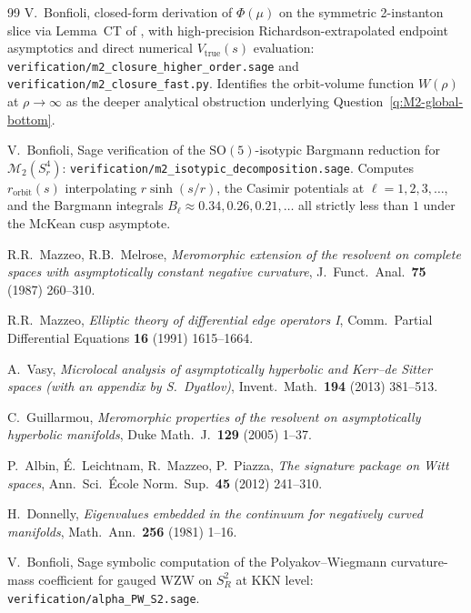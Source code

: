 \documentclass[11pt,letterpaper]{article}
\theoremstyle{definition}
\newcommand{\cM}{\mathcal{M}}
\begin{document}
\begin{thebibliography}{99}
 V.\ Bonfioli, closed-form derivation of $\Phi(\mu)$ on the symmetric 2-instanton slice via Lemma~CT of \cite{bonfioli-core}, with high-precision Richardson-extrapolated endpoint asymptotics and direct numerical $V_{\mathrm{true}}(s)$ evaluation: \texttt{verification/m2\_closure\_higher\_order.sage} and \texttt{verification/m2\_closure\_fast.py}. Identifies the orbit-volume function $W(\rho)$ at $\rho\to\infty$ as the deeper analytical obstruction underlying Question~\ref{q:M2-global-bottom}.

 V.\ Bonfioli, Sage verification of the $\mathrm{SO}(5)$-isotypic Bargmann reduction for $\cM_2(S^4_r)$: \texttt{verification/m2\_isotypic\_decomposition.sage}. Computes $r_{\mathrm{orbit}}(s)$ interpolating $r\sinh(s/r)$, the Casimir potentials at $\ell=1,2,3,\ldots$, and the Bargmann integrals $B_\ell\approx 0.34,0.26,0.21,\ldots$ all strictly less than $1$ under the McKean cusp asymptote.

 R.R.\ Mazzeo, R.B.\ Melrose, \emph{Meromorphic extension of the resolvent on complete spaces with asymptotically constant negative curvature}, J.\ Funct.\ Anal.\ \textbf{75} (1987) 260--310.

 R.R.\ Mazzeo, \emph{Elliptic theory of differential edge operators I}, Comm.\ Partial Differential Equations \textbf{16} (1991) 1615--1664.

 A.\ Vasy, \emph{Microlocal analysis of asymptotically hyperbolic and Kerr--de Sitter spaces (with an appendix by S.\ Dyatlov)}, Invent.\ Math.\ \textbf{194} (2013) 381--513.

 C.\ Guillarmou, \emph{Meromorphic properties of the resolvent on asymptotically hyperbolic manifolds}, Duke Math.\ J.\ \textbf{129} (2005) 1--37.

 P.\ Albin, \'E.\ Leichtnam, R.\ Mazzeo, P.\ Piazza, \emph{The signature package on Witt spaces}, Ann.\ Sci.\ \'Ecole Norm.\ Sup.\ \textbf{45} (2012) 241--310.

 H.\ Donnelly, \emph{Eigenvalues embedded in the continuum for negatively curved manifolds}, Math.\ Ann.\ \textbf{256} (1981) 1--16.

 V.\ Bonfioli, Sage symbolic computation of the Polyakov--Wiegmann curvature-mass coefficient for gauged WZW on $S^2_R$ at KKN level: \texttt{verification/alpha\_PW\_S2.sage}.


\end{thebibliography}
\end{document}
